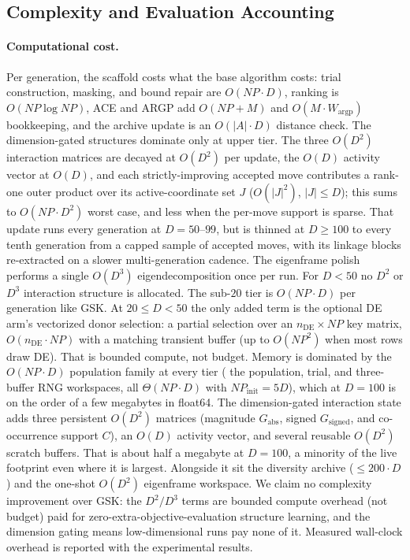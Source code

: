 \subsection{Complexity and Evaluation Accounting}\label{sec:alg:complexity}

\paragraph{Computational cost.}
Per generation, the scaffold costs what the base algorithm costs:
trial construction, masking, and bound repair are $O(NP\cdot D)$,
ranking is $O(NP\log NP)$, ACE and ARGP add $O(NP+M)$ and
$O(M\cdot W_{\text{argp}})$ bookkeeping, and the archive update is an
$O(|A|\cdot D)$ distance check. %
The dimension-gated structures dominate only at upper tier. The three
$O(D^{2})$ interaction matrices are decayed at $O(D^{2})$ per update, the
$O(D)$ activity vector at $O(D)$, and each
strictly-improving accepted move contributes a rank-one outer product over
its active-coordinate set $J$ ($O(|J|^{2})$, $|J|\le D$); this sums to
$O(NP\cdot D^{2})$ worst case, and less when the per-move support is sparse.
That update runs every generation at $D=50$--$99$, but is thinned at $D\ge100$
to every tenth generation from a capped sample of accepted moves, with its
linkage blocks re-extracted on a slower multi-generation cadence. The
eigenframe polish performs a single $O(D^{3})$ eigendecomposition once per
run. %
For $D<50$ no $D^{2}$ or $D^{3}$ interaction structure is allocated. The
sub-$20$ tier is $O(NP\cdot D)$ per generation like GSK. At $20\le D<50$ the
only added term is the optional DE arm's vectorized donor selection: a partial
selection over an $n_{\mathrm{DE}}\times NP$ key matrix, $O(n_{\mathrm{DE}}\cdot NP)$
with a matching transient buffer (up to $O(NP^{2})$ when most rows draw DE).
That is bounded compute, not budget. %
Memory is dominated by the $O(NP\cdot D)$ population family at every tier (
the population, trial, and three-buffer RNG workspaces, all $\Theta(NP\cdot D)$
with $NP_{\text{init}}=5D$), which at $D=100$ is on the order of a few
megabytes in float64.  The dimension-gated interaction state adds three
persistent $O(D^{2})$ matrices (magnitude $G_{\mathrm{abs}}$, signed
$G_{\mathrm{signed}}$, and co-occurrence support $C$), an $O(D)$ activity vector,
and several reusable $O(D^{2})$ scratch buffers. That is about half a megabyte at
$D=100$, a minority of the live footprint even where it is largest. Alongside
it sit the diversity archive ($\le 200\cdot D$) and the one-shot $O(D^{2})$
eigenframe workspace. %
We claim no complexity improvement over GSK: the $D^{2}/D^{3}$ terms
are bounded compute overhead (not budget) paid for
zero-extra-objective-evaluation structure learning, and the
dimension gating means low-dimensional runs pay none of it.
Measured wall-clock overhead is reported with the experimental
results.

